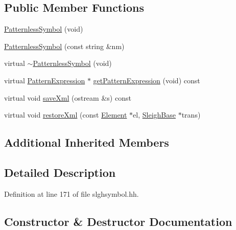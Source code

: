 \subsection*{Public Member Functions}
\begin{DoxyCompactItemize}
\item 
\mbox{\hyperlink{class_patternless_symbol_aa411b98c4eb3865831a9e175a3b56cda}{Patternless\+Symbol}} (void)
\item 
\mbox{\hyperlink{class_patternless_symbol_a26f3d4305a994ae113ae8e37ec90dddd}{Patternless\+Symbol}} (const string \&nm)
\item 
virtual \mbox{\hyperlink{class_patternless_symbol_a9f513a474e0c723c5784920a56a459e8}{$\sim$\+Patternless\+Symbol}} (void)
\item 
virtual \mbox{\hyperlink{class_pattern_expression}{Pattern\+Expression}} $\ast$ \mbox{\hyperlink{class_patternless_symbol_aa0143261780eb2f63e09a6f8f377a888}{get\+Pattern\+Expression}} (void) const
\item 
virtual void \mbox{\hyperlink{class_patternless_symbol_a4afb029a1e6456ffa90468cb29587529}{save\+Xml}} (ostream \&s) const
\item 
virtual void \mbox{\hyperlink{class_patternless_symbol_ab81f5522c0e65c2fe464d4bb62193948}{restore\+Xml}} (const \mbox{\hyperlink{class_element}{Element}} $\ast$el, \mbox{\hyperlink{class_sleigh_base}{Sleigh\+Base}} $\ast$trans)
\end{DoxyCompactItemize}
\subsection*{Additional Inherited Members}


\subsection{Detailed Description}


Definition at line 171 of file slghsymbol.\+hh.



\subsection{Constructor \& Destructor Documentation}
\mbox{\label{class_patternless_symbol_aa411b98c4eb3865831a9e175a3b56cda}} 
